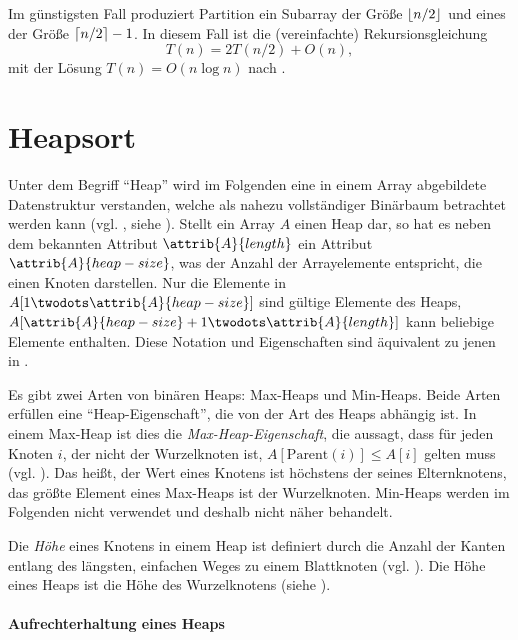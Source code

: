 Im günstigsten Fall produziert $\text{Partition}$ ein Subarray der Größe $\left\lfloor n/2 \right\rfloor$ und eines der Größe $\left\lceil n/2 \right\rceil - 1$. In diesem Fall ist die (vereinfachte) Rekursionsgleichung
\begin{equation*}
    T(n) = 2T(n/2) + O(n),
\end{equation*}
mit der Lösung $T(n) = O(n \log n)$ nach \cite[94]{clrs2001}.

\section{Heapsort}
\label{sec:alg-selection}

Unter dem Begriff \enquote{Heap} wird im Folgenden eine in einem Array abgebildete Datenstruktur verstanden, welche als nahezu vollständiger Binärbaum betrachtet werden kann (vgl. \cite[87f]{ahu1974}, siehe ). Stellt ein Array $A$ einen Heap dar, so hat es neben dem bekannten Attribut $\attrib{A}{length}$ ein Attribut $\attrib{A}{heap-size}$, was der Anzahl der Arrayelemente entspricht, die einen Knoten darstellen. Nur die Elemente in $A[1 \twodots \attrib{A}{heap-size}]$ sind gültige Elemente des Heaps, $A[\attrib{A}{heap-size} + 1 \twodots \attrib{A}{length}]$ kann beliebige Elemente enthalten. Diese Notation und Eigenschaften sind äquivalent zu jenen in \cite{clrs2001}.

Es gibt zwei Arten von binären Heaps: Max-Heaps und Min-Heaps. Beide Arten erfüllen eine \enquote{Heap-Eigenschaft}, die von der Art des Heaps abhängig ist. In einem Max-Heap ist dies die \emph{Max-Heap-Eigenschaft}, die aussagt, dass für jeden Knoten $i$, der nicht der Wurzelknoten ist, $A[\text{Parent}(i)] \leq A[i]$ gelten muss (vgl. \cite[92]{hsr1997}). Das heißt, der Wert eines Knotens ist höchstens der seines Elternknotens, das größte Element eines Max-Heaps ist der Wurzelknoten. Min-Heaps werden im Folgenden nicht verwendet und deshalb nicht näher behandelt.

Die \emph{Höhe} eines Knotens in einem Heap ist definiert durch die Anzahl der Kanten entlang des längsten, einfachen Weges zu einem Blattknoten (vgl. \cite[153]{clrs2001}). Die Höhe eines Heaps ist die Höhe des Wurzelknotens (siehe ).



\paragraph{Aufrechterhaltung eines Heaps}

